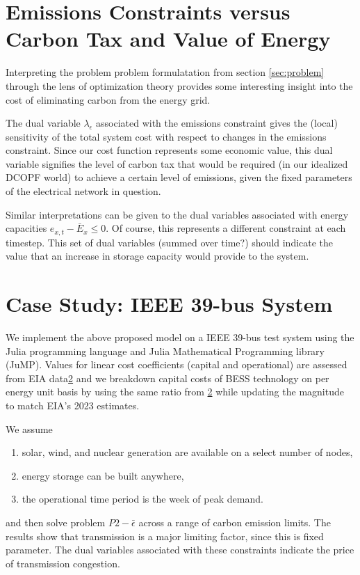 \documentclass[journal,11pt]{IEEEtran}
\begin{document}
\section{Emissions Constraints versus Carbon Tax and Value of Energy}
Interpreting the problem problem formulatation from section \ref{sec:problem}
through the lens of optimization theory provides some interesting
insight into the cost of eliminating carbon from the energy grid.

The dual variable $\lambda_\epsilon$ associated with the emissions constraint gives 
the (local) sensitivity of the total system cost with respect to changes in the emissions constraint.
Since our cost function represents some economic value, this dual variable signifies the 
level of carbon tax that would be required (in our idealized DCOPF world) to achieve a certain level of emissions,
given the fixed parameters of the electrical network in question.

Similar interpretations can be given to the dual variables associated with energy capacities $e_{x, t} - \bar{E}_x \leq 0$.
Of course, this represents a different constraint at each timestep. This set of dual variables (summed over time?) should indicate
the value that an increase in storage capacity would provide to the system. 


\section{Case Study: IEEE 39-bus System}

We implement the above proposed model on a IEEE 39-bus test system using the Julia programming language and Julia Mathematical Programming
library (JuMP). Values for linear cost coefficients (capital and operational) are assessed from EIA data\ref{} and we breakdown
capital costs of BESS technology on per energy unit basis by using the same ratio from \ref{} while updating the magnitude
to match EIA's 2023 estimates. 

We assume 
\begin{enumerate}
  \item solar, wind, and nuclear generation are available on a select number of nodes,
  \item energy storage can be built anywhere,
  \item the operational time period is the week of peak demand.
\end{enumerate} 

and then solve problem $P2-\bar{\epsilon}$ across a range of carbon emission limits.
The results show that transmission is a major limiting factor, since this is fixed parameter. The dual variables associated with these
constraints indicate the price of transmission congestion.
\end{document}
